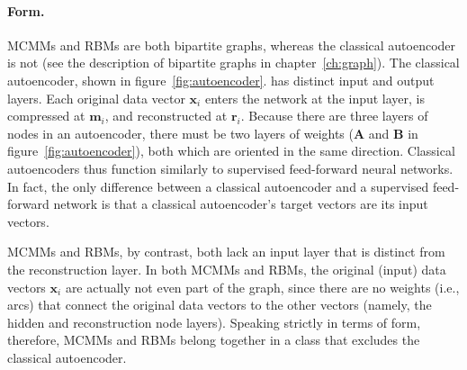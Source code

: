 \paragraph{Form.}

MCMMs and RBMs are both bipartite graphs, whereas the classical autoencoder is 
not (see the description of bipartite graphs in chapter~\ref{ch:graph}).
The classical autoencoder, shown in figure~\ref{fig:autoencoder}. has distinct input 
and output layers. Each original data vector $\textbf{x}_i$ enters the network at the input layer, is compressed 
at $\textbf{m}_i$, and reconstructed at $\textbf{r}_i$. Because there are three layers 
of nodes in an autoencoder, there must be two layers of weights ($\textbf{A}$ and $\textbf{B}$ in figure~\ref{fig:autoencoder}), both which are oriented in the same direction.
Classical autoencoders thus function similarly to supervised feed-forward neural networks. 
In fact, the only difference between a classical autoencoder and a supervised 
feed-forward network is that a classical autoencoder's target vectors are its input vectors. 

MCMMs and RBMs, by contrast, both lack an input layer that is distinct from the reconstruction layer. In both MCMMs and RBMs,
the original (input) data vectors $\textbf{x}_i$ are actually not even part of the graph, since there are no weights (i.e., arcs) that connect the original data vectors to the other vectors (namely, the hidden and reconstruction node layers). 
Speaking strictly in terms of form, therefore, MCMMs and RBMs belong together in a class that excludes the classical autoencoder.

